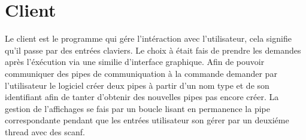 \documentclass[12pt]{article}
\begin{document}
\section{Client}
    Le client est le programme qui gére l'intéraction avec l'utilisateur, cela signifie qu'il passe par des entrées claviers.
    Le choix à était fais de prendre les demandes après l'éxécution via une similie d'interface graphique.
    Afin de pouvoir communiquer des pipes de communiquation à la commande demander par l'utilisateur le logiciel créer deux pipes à partir d'un nom type et de son identifiant afin de tanter d'obtenir des nouvelles pipes pas encore créer.
    La gestion de l'affichages se fais par un boucle lisant en permanence la pipe correspondante pendant que les entrées utilisateur son gérer par un deuxiéme thread avec des scanf.
\end{document}
